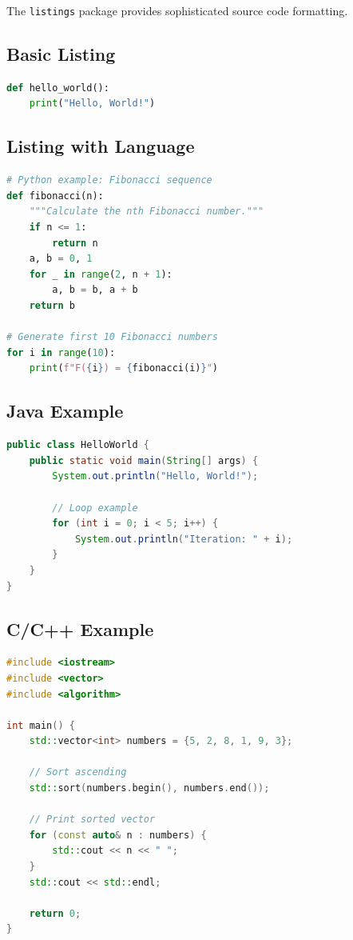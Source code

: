 The \texttt{listings} package provides sophisticated source code formatting.

\subsection{Basic Listing}

\begin{lstlisting}[language=Python, caption=Basic code listing]
def hello_world():
    print("Hello, World!")
\end{lstlisting}

\subsection{Listing with Language}

\begin{lstlisting}[language=Python, caption=Python example with syntax highlighting]
# Python example: Fibonacci sequence
def fibonacci(n):
    """Calculate the nth Fibonacci number."""
    if n <= 1:
        return n
    a, b = 0, 1
    for _ in range(2, n + 1):
        a, b = b, a + b
    return b

# Generate first 10 Fibonacci numbers
for i in range(10):
    print(f"F({i}) = {fibonacci(i)}")
\end{lstlisting}

\subsection{Java Example}

\begin{lstlisting}[language=Java, caption=Java example]
public class HelloWorld {
    public static void main(String[] args) {
        System.out.println("Hello, World!");

        // Loop example
        for (int i = 0; i < 5; i++) {
            System.out.println("Iteration: " + i);
        }
    }
}
\end{lstlisting}

\subsection{C/C++ Example}

\begin{lstlisting}[language=C++, caption=C++ example]
#include <iostream>
#include <vector>
#include <algorithm>

int main() {
    std::vector<int> numbers = {5, 2, 8, 1, 9, 3};

    // Sort ascending
    std::sort(numbers.begin(), numbers.end());

    // Print sorted vector
    for (const auto& n : numbers) {
        std::cout << n << " ";
    }
    std::cout << std::endl;

    return 0;
}
\end{lstlisting}


